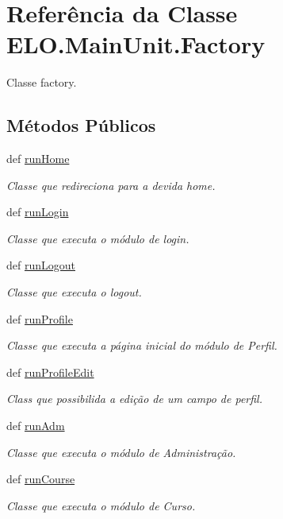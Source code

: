 \hypertarget{classELO_1_1MainUnit_1_1Factory}{\section{Referência da Classe E\-L\-O.\-Main\-Unit.\-Factory}
\label{classELO_1_1MainUnit_1_1Factory}
}


Classe factory.  


\subsection*{Métodos Públicos}
\begin{DoxyCompactItemize}
\item 
def \hyperlink{classELO_1_1MainUnit_1_1Factory_a766943202ba781821cf749ca0fb133ba}{run\-Home}
\begin{DoxyCompactList}\small\item\em Classe que redireciona para a devida home. \end{DoxyCompactList}\item 
def \hyperlink{classELO_1_1MainUnit_1_1Factory_a515d1ff460a335b750e58e0cbddf20ae}{run\-Login}
\begin{DoxyCompactList}\small\item\em Classe que executa o módulo de login. \end{DoxyCompactList}\item 
def \hyperlink{classELO_1_1MainUnit_1_1Factory_aa26c51486ba65030399897a6e3b4f4f1}{run\-Logout}
\begin{DoxyCompactList}\small\item\em Classe que executa o logout. \end{DoxyCompactList}\item 
def \hyperlink{classELO_1_1MainUnit_1_1Factory_ab20a76f74180fc77c6b8fcd8de7942f1}{run\-Profile}
\begin{DoxyCompactList}\small\item\em Classe que executa a página inicial do módulo de Perfil. \end{DoxyCompactList}\item 
def \hyperlink{classELO_1_1MainUnit_1_1Factory_acb3772dd3c00357be1985af09c824858}{run\-Profile\-Edit}
\begin{DoxyCompactList}\small\item\em Class que possibilida a edição de um campo de perfil. \end{DoxyCompactList}\item 
def \hyperlink{classELO_1_1MainUnit_1_1Factory_a533b402a54bf6f6715824a8687fa7a24}{run\-Adm}
\begin{DoxyCompactList}\small\item\em Classe que executa o módulo de Administração. \end{DoxyCompactList}\item 
def \hyperlink{classELO_1_1MainUnit_1_1Factory_a5e360bc5396fd576e0614b9e157b3816}{run\-Course}
\begin{DoxyCompactList}\small\item\em Classe que executa o módulo de Curso. \end{DoxyCompactList}\end{DoxyCompactItemize}
